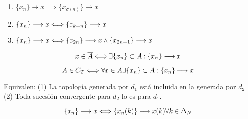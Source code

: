     \begin{prop} \\
        \begin{enumerate}
            \item $\{x_n\} \longrightarrow x \implies \{x_{\sigma(n)}\} \longrightarrow x $
            \item $\{x_n\} \longrightarrow x \Longleftrightarrow \{x_{k+n}\} \longrightarrow x $
            \item $\{x_n\} \longrightarrow x \Longleftrightarrow \{x_{2n}\} \longrightarrow x \wedge \{x_{2n+1}\} \longrightarrow x $
        \end{enumerate} 
    \end{prop}

    \begin{prop}
        $$x\in \overline{A} \\ \Longleftrightarrow \\ \exists\{x_n\} \subset A: \{x_n\} \longrightarrow x$$
    \end{prop}

    \begin{prop}
        $$A \in C_T \\ \Longleftrightarrow \\ \forall x\in A \\ \exists\{x_n\}\subset A : \{x_n\} \longrightarrow x$$
    \end{prop}

    \begin{prop}
        Equivalen:\newline
        (1) La topología generada por $d_1$ está incluida en la generada por $d_2$ \newline
        (2) Toda sucesión convergente para $d_2$ lo es para $d_1$.\newline
    \end{prop}
    
    \begin{prop}[Convergencia en $\rn$]
        $$\{x_n\} \longrightarrow x \\ \Longleftrightarrow \\ \{x_n(k)\} \longrightarrow x(k) \\ \forall k \in \Delta_N$$
    \end{prop}
    
    